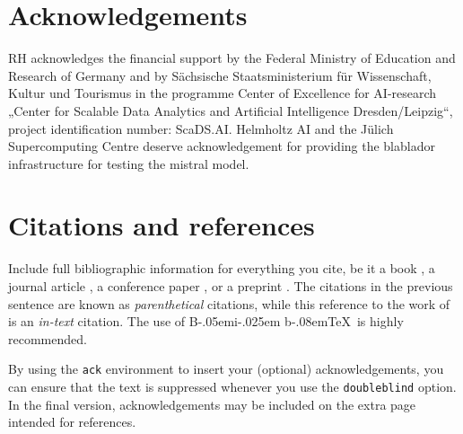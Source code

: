 \documentclass{ecai}
\newcommand{\BibTeX}{B\kern-.05em{\sc i\kern-.025em b}\kern-.08em\TeX}
\begin{document}
\section{Acknowledgements}
RH acknowledges the financial support by the Federal Ministry of Education and Research of Germany and by Sächsische Staatsministerium für Wissenschaft, Kultur und Tourismus in the programme Center of Excellence for AI-research „Center for Scalable Data Analytics and Artificial Intelligence Dresden/Leipzig“, project identification number: ScaDS.AI.
Helmholtz AI and the Jülich Supercomputing Centre deserve acknowledgement for providing the blablador infrastructure for testing the mistral model.





\section{Citations and references}

Include full bibliographic information for everything you cite, 
be it a book \citep{pearl2009causality}, a journal article 
\citep{grosz1996collaborative,rumelhart1986learning,turing1950computing}, 
a conference paper \citep{kautz1992planning}, or a preprint 
\citep{perelman2002entropy}. The citations in the previous sentence are 
known as \emph{parenthetical} citations, while this reference to the 
work of \citet{turing1950computing} is an \emph{in-text} citation.
The use of \BibTeX\ is highly recommended. 



\begin{ack}
By using the \texttt{ack} environment to insert your (optional) 
acknowledgements, you can ensure that the text is suppressed whenever 
you use the \texttt{doubleblind} option. In the final version, 
acknowledgements may be included on the extra page intended for references.
\end{ack}




\end{document}
